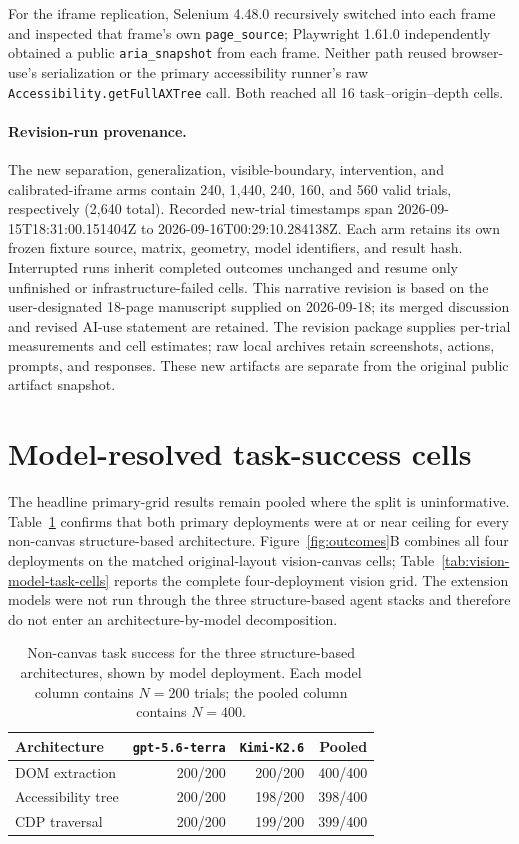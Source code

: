 \documentclass{article}
\begin{document}
For the iframe replication, Selenium 4.48.0 recursively switched into each frame and inspected that frame's own \texttt{page\_source}; Playwright 1.61.0 independently obtained a public \texttt{aria\_snapshot} from each frame. Neither path reused browser-use's serialization or the primary accessibility runner's raw \texttt{Accessibility.getFullAXTree} call. Both reached all 16 task--origin--depth cells.

\paragraph{Revision-run provenance.} The new separation, generalization, visible-boundary, intervention, and calibrated-iframe arms contain 240, 1,440, 240, 160, and 560 valid trials, respectively (2,640 total). Recorded new-trial timestamps span 2026-09-15T18:31:00.151404Z to 2026-09-16T00:29:10.284138Z. Each arm retains its own frozen fixture source, matrix, geometry, model identifiers, and result hash. Interrupted runs inherit completed outcomes unchanged and resume only unfinished or infrastructure-failed cells. This narrative revision is based on the user-designated 18-page manuscript supplied on 2026-09-18; its merged discussion and revised AI-use statement are retained. The revision package supplies per-trial measurements and cell estimates; raw local archives retain screenshots, actions, prompts, and responses. These new artifacts are separate from the original public artifact snapshot.

\section{Model-resolved task-success cells}
\label{app:modelcells}

The headline primary-grid results remain pooled where the split is uninformative. Table~\ref{tab:structural-models} confirms that both primary deployments were at or near ceiling for every non-canvas structure-based architecture. Figure~\ref{fig:outcomes}B combines all four deployments on the matched original-layout vision-canvas cells; Table~\ref{tab:vision-model-task-cells} reports the complete four-deployment vision grid. The extension models were not run through the three structure-based agent stacks and therefore do not enter an architecture-by-model decomposition.

\begin{table}[h]
  \caption{Non-canvas task success for the three structure-based architectures, shown by model deployment. Each model column contains $N=200$ trials; the pooled column contains $N=400$.}
  \label{tab:structural-models}
  \centering
  \small
  \begin{tabular}{lrrr}
    \toprule
    Architecture & \texttt{gpt-5.6-terra} & \texttt{Kimi-K2.6} & Pooled \\
    \midrule
    DOM extraction & 200/200 & 200/200 & 400/400 \\
    Accessibility tree & 200/200 & 198/200 & 398/400 \\
    CDP traversal & 200/200 & 199/200 & 399/400 \\
    \bottomrule
  \end{tabular}
\end{table}
\end{document}
